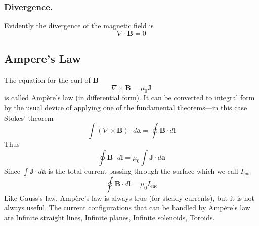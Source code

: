 \documentclass[../../../main.tex]{subfiles}
\begin{document}
\subsubsection*{Divergence.} Evidently the divergence of the magnetic ﬁeld is
\begin{equation*}
    \nabla \cdot \mathbf{B}=0
\end{equation*}

\subsection*{Ampere's Law}
The equation for the curl of \textbf{B}
\begin{equation*}
    \nabla\times \mathbf{B}=\mu_0 \mathbf{J}
\end{equation*}
is called Ampère’s law (in differential form). It can be converted to integral form by the usual device of applying one of the fundamental theorems—in this case Stokes’ theorem
\begin{equation*}
    \int(\nabla\times \mathbf{B})\cdot d\mathbf{a}=\oint \mathbf{B}\cdot d\mathbf{l}
\end{equation*}
Thus
\begin{equation*}
    \oint \mathbf{B}\cdot d\mathbf{l}=\mu_0\int\mathbf{J} \cdot d\mathbf{a}
\end{equation*}
Since $\int\mathbf{J} \cdot d\mathbf{a}$ is the total current passing through the surface which we call $I_{\text{enc}}$ 
\begin{equation*}
    \oint \mathbf{B}\cdot d\mathbf{l}=\mu_0I_{\text{enc}}
\end{equation*}
Like Gauss’s law, Ampère’s law is always true (for steady currents), but it is not always useful. The current conﬁgurations that can be handled by Ampère’s law are Inﬁnite straight lines, Inﬁnite planes, Inﬁnite solenoids, Toroids. 
\end{document}
